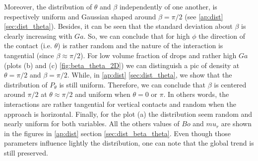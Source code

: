 Moreover, the distribution of $\theta$ and $\beta$ independently of one another, is respectively uniform and Gaussian shaped around $\beta = \pi/2$ (see \ref{ap:dist} \ref{sec:dist_theta}).
Besides, it can be seen that the standard deviation  about $\beta$ is clearly increasing with $Ga$. 
So, we can conclude that for high $\phi$ the direction of the contact (i.e. $\theta$) is rather random and the nature of the interaction is tangential (since $\beta \approx \pi/2$). 
For low volume fraction of drops and rather high $Ga$ (plots (b) and (c) \ref{fig:beta_theta_2D}) we can distinguish a pic of density at $\theta = \pi/2$ and $\beta = \pi/2$. 
While, in \ref{ap:dist} \ref{sec:dist_theta}, we show that the distribution of $P_\theta$ is still uniform. 
Therefore, we can conclude that $\beta$ is centered around $\pi/2$ at $\theta \approx \pi/2$ and uniform when $\theta = 0$ or $\pi$. 
In others words, the interactions are rather tangential for vertical contacts and random when the approach is horizontal. 
Finally, for the plot (a) the distribution seem random and nearly uniform for both variables. 
All the others values of $Bo$ and $mu_r$ are shown in the figures in \ref{ap:dist} section \ref{sec:dist_beta_theta}.
Even though  those parameters influence lightly the distribution, one can note that the global trend is still preserved.

